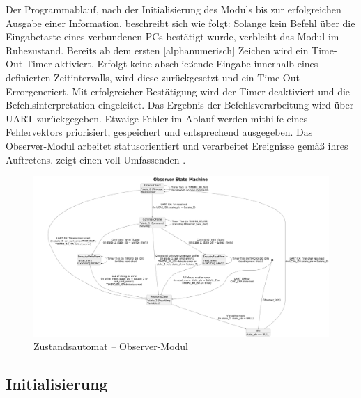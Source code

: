 Der Programmablauf, nach der Initialisierung des Moduls bis zur erfolgreichen Ausgabe einer Information, beschreibt sich wie folgt:
Solange kein Befehl \"uber die Eingabetaste eines verbundenen PCs best\"atigt wurde, verbleibt das Modul im Ruhezustand. Bereits ab dem ersten [alphanumerisch] Zeichen wird ein \glqq Time-Out\grqq-Timer aktiviert. Erfolgt keine abschlie{\ss}ende Eingabe innerhalb eines definierten Zeitintervalls, wird diese zur\"uckgesetzt und ein \glqq Time-Out-Error\grqq generiert. Mit erfolgreicher Best\"atigung wird der Timer deaktiviert und die Befehlsinterpretation eingeleitet. Das Ergebnis der Befehlsverarbeitung wird \"uber UART zur\"uckgegeben. Etwaige Fehler im Ablauf werden mithilfe eines Fehlervektors priorisiert, gespeichert und entsprechend ausgegeben. Das Observer-Modul arbeitet statusorientiert und verarbeitet Ereignisse gem\"a{\ss} ihres Auftretens.  zeigt einen voll Umfassenden .

\begin{figure}[h!]
	\centering
	\includegraphics[width=1.0\textwidth]{../Bilder/observer_state_machine.png}
	\caption{Zustandsautomat -- Observer-Modul}
	\label{fig:StateMachine_ObserverModul}
\end{figure}

\newpage
\subsection{Initialisierung}
\label{Init}

